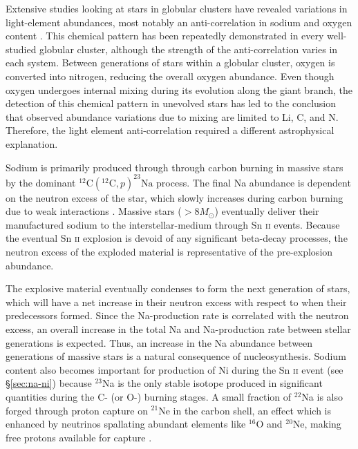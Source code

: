 \documentclass{emulateapj}
\begin{document}
Extensive studies looking at stars in globular clusters have revealed variations in light-element abundances, most notably an anti-correlation in sodium and oxygen content \citet[][and references therein]{norris;da_costa_1995,carretta;et-al_2009_na_o}. This chemical pattern has been repeatedly demonstrated in every well-studied globular cluster, although the strength of the anti-correlation varies in each system. Between generations of stars within a globular cluster, oxygen is converted into nitrogen, reducing the overall oxygen abundance. Even though oxygen undergoes internal mixing during its evolution along the giant branch, the detection of this chemical pattern in unevolved stars has led to the conclusion that observed abundance variations due to mixing are limited to Li, C, and N. Therefore, the light element anti-correlation required a different astrophysical explanation.

Sodium is primarily produced through through carbon burning in massive stars by the dominant $^{12}\mbox{C}(^{12}\mbox{C}, p)^{23}\mbox{Na}$ process. The final Na abundance is dependent on the neutron excess of the star, which slowly increases during carbon burning due to weak interactions \citep{arnett;truran_1974}. Massive stars ($>8 M_\odot$) eventually deliver their manufactured sodium to the interstellar-medium through Sn \textsc{ii} events. Because the eventual Sn \textsc{ii} explosion is devoid of any significant beta-decay processes, the neutron excess of the exploded material is representative of the pre-explosion abundance.  
  
The explosive material eventually condenses to form the next generation of stars, which will have a net increase in their neutron excess with respect to when their predecessors formed. Since the Na-production rate is correlated with the neutron excess, an overall increase in the total Na and Na-production rate between stellar generations is expected. Thus, an increase in the Na abundance between generations of massive stars is a natural consequence of nucleosynthesis. Sodium content also becomes important for production of Ni during the Sn \textsc{ii} event (see \S\ref{sec:na-ni}) because $^{23}$Na is the only stable isotope produced in significant quantities during the C- (or O-) burning stages. A small fraction of $^{22}$Na is also forged through proton capture on $^{21}$Ne in the carbon shell, an effect which is enhanced by neutrinos spallating abundant elements like $^{16}$O and $^{20}$Ne, making free protons available for capture \citep{woosley;weaver_1995}.
\end{document}
